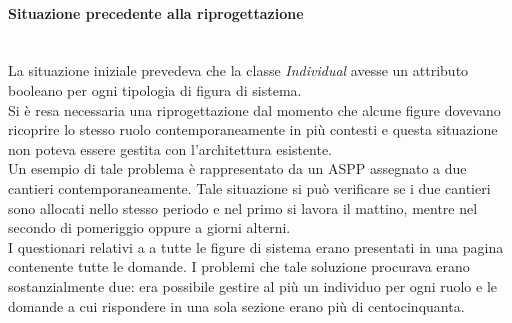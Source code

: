 	\paragraph*{Situazione precedente alla riprogettazione} \mbox{} \\
	
	La situazione iniziale prevedeva che la classe \textit{Individual} avesse  un attributo booleano per ogni tipologia di figura di sistema. \\
	Si è resa necessaria una riprogettazione dal momento che alcune figure dovevano ricoprire lo stesso ruolo contemporaneamente in più contesti e questa situazione non poteva essere gestita con l'architettura esistente. \\
	Un esempio di tale problema è rappresentato da un ASPP assegnato a due cantieri contemporaneamente. Tale situazione si può verificare se i due cantieri sono allocati nello stesso periodo e nel primo si lavora il mattino, mentre nel secondo di pomeriggio oppure a giorni alterni.\\
	I questionari relativi a a tutte le figure di sistema erano presentati in una pagina contenente tutte le domande. I problemi che tale soluzione procurava erano sostanzialmente due: era possibile gestire al più un individuo per ogni ruolo e le domande a cui rispondere in una sola sezione erano più di centocinquanta.

